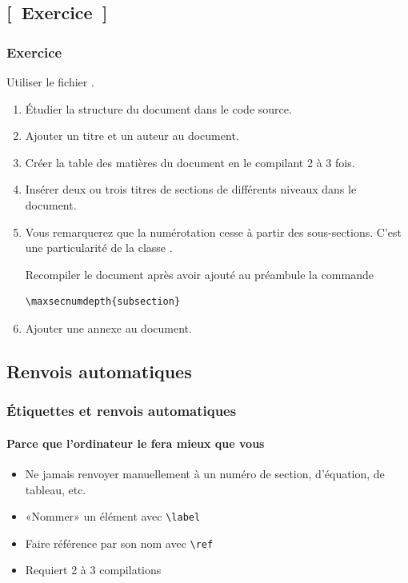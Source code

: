 \subsection{[~Exercice~]}

\begin{frame}[fragile=singleslide,plain]
  \frametitle{Exercice}

  Utiliser le fichier .

  \begin{enumerate}
  \item Étudier la structure du document dans le code source.
  \item Ajouter un titre et un auteur au document.
  \item Créer la table des matières du document en le compilant 2 à 3
    fois.
  \item Insérer deux ou trois titres de sections de différents niveaux
    dans le document.
  \item Vous remarquerez que la numérotation cesse à partir des
    sous-sections. C'est une particularité de la classe
    .

    Recompiler le document après avoir ajouté au préambule la commande
\begin{lstlisting}
\maxsecnumdepth{subsection}
\end{lstlisting}
  \item Ajouter une annexe au document.
  \end{enumerate}
\end{frame}

\subsection{Renvois automatiques}

\begin{frame}[fragile=singleslide]
  \frametitle{Étiquettes et renvois automatiques}
  \framesubtitle{Parce que l'ordinateur le fera mieux que vous}

  \begin{itemize}
  \item Ne \alert{jamais} renvoyer manuellement à un numéro de
    section, d'équation, de tableau, etc.
  \item «Nommer» un élément avec \verb=\label=
  \item Faire référence par son nom avec \verb=\ref=
  \item Requiert 2 à 3 compilations
  \end{itemize}
\end{frame}

